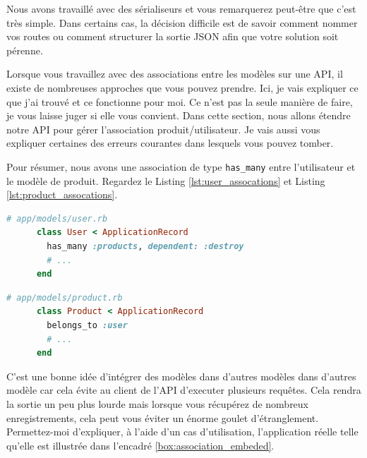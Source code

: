 \documentclass[]{report}
\begin{document}
    Nous avons travaillé avec des sérialiseurs et vous remarquerez peut-être que c'est très simple. Dans certains cas, la décision difficile est de savoir comment nommer vos routes ou comment structurer la sortie JSON afin que votre solution soit pérenne.

    Lorsque vous travaillez avec des associations entre les modèles sur une API, il existe de nombreuses approches que vous pouvez prendre. Ici, je vais expliquer ce que j'ai trouvé et ce fonctionne pour moi. Ce n'est pas la seule manière de faire, je vous laisse juger si elle vous convient. Dans cette section, nous allons étendre notre API pour gérer l'association produit/utilisateur. Je vais aussi vous expliquer certaines des erreurs courantes dans lesquels vous pouvez tomber.

    Pour résumer, nous avons une association de type \verb|has_many| entre l'utilisateur et le modèle de produit. Regardez le Listing \ref{lst:user_assocations} et Listing \ref{lst:product_assocations}.

    \begin{scriptsize}
      \begin{lstlisting}[language=ruby, caption={Associations des utilisateurs}, label={lst:user_assocations}]
      # app/models/user.rb
      class User < ApplicationRecord
        has_many :products, dependent: :destroy
        # ...
      end
      \end{lstlisting}
    \end{scriptsize}

    \begin{scriptsize}
      \begin{lstlisting}[language=ruby, caption={Associations des produits}, label={lst:product_assocations}]
      # app/models/product.rb
      class Product < ApplicationRecord
        belongs_to :user
        # ...
      end
      \end{lstlisting}
    \end{scriptsize}

    C'est une bonne idée d'intégrer des modèles dans d'autres modèles dans d'autres modèle car cela évite au client de l'API d'executer plusieurs requêtes. Cela rendra la sortie un peu plus lourde mais lorsque vous récupérez de nombreux enregistrements, cela peut vous éviter un énorme goulet d'étranglement. Permettez-moi d'expliquer, à l'aide d'un cas d'utilisation, l'application réelle telle qu'elle est illustrée dans l'encadré \ref{box:association_embeded}.
\end{document}
